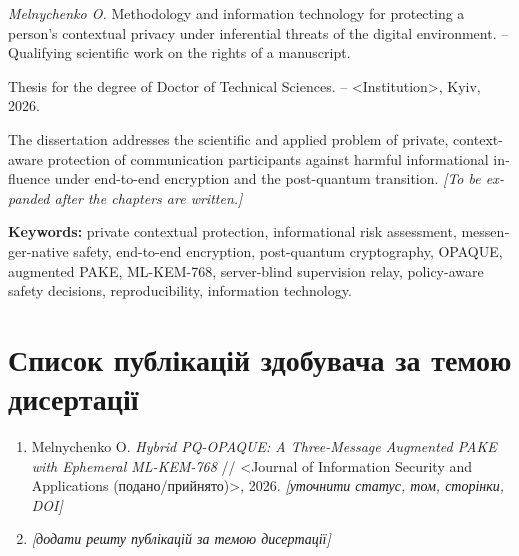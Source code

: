 \begin{english}
\noindent\textit{Melnychenko O.} Methodology and information technology for protecting a person's contextual privacy under inferential threats of the digital environment. -- Qualifying scientific work on the rights of a manuscript.

\medskip

\noindent Thesis for the degree of Doctor of Technical Sciences. -- <Institution>, Kyiv, 2026.

\bigskip

\noindent The dissertation addresses the scientific and applied problem of private, context-aware protection of communication participants against harmful informational influence under end-to-end encryption and the post-quantum transition. \emph{[To be expanded after the chapters are written.]}

\bigskip

\noindent\textbf{Keywords:} private contextual protection, informational risk assessment, messenger-native safety, end-to-end encryption, post-quantum cryptography, OPAQUE, augmented PAKE, ML-KEM-768, server-blind supervision relay, policy-aware safety decisions, reproducibility, information technology.
\end{english}


\section*{Список публікацій здобувача за темою дисертації}

\begin{enumerate}
  \item Melnychenko O. \emph{Hybrid PQ-OPAQUE: A Three-Message Augmented PAKE with Ephemeral ML-KEM-768} // <Journal of Information Security and Applications (подано/прийнято)>, 2026. \emph{[уточнити статус, том, сторінки, DOI]}
  \item \emph{[додати решту публікацій за темою дисертації]}
\end{enumerate}
